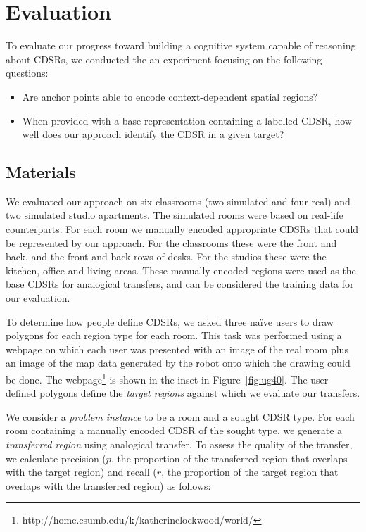 \section{Evaluation}\label{sec:evaluation}

To evaluate our progress toward building a cognitive system capable of reasoning about CDSRs, we conducted the an experiment focusing on the following questions:
\begin{itemize}
\item{Are anchor points able to encode context-dependent spatial regions?}
\item{When provided with a base representation containing a labelled CDSR, how well does our approach identify the CDSR in a given target?}
\end{itemize}

\subsection{Materials}

We evaluated our approach on six classrooms (two simulated and four real) and two simulated studio apartments. The simulated rooms were based on real-life counterparts. For each room we manually encoded appropriate CDSRs that could be represented by our approach. For the classrooms these were the front and back, and the front and back rows of desks. For the studios these were the kitchen, office and living areas. These manually encoded regions were used as the base CDSRs for analogical transfers, and can be considered the training data for our evaluation. 

To determine how people define CDSRs, we asked three na\"ive users to draw polygons for each region type for each room. This task was performed using a webpage on which each user was presented with an image of the real room plus an image of the map data generated by the robot onto which the drawing could be done. The webpage\footnote{http://home.csumb.edu/k/katherinelockwood/world/} is shown in the inset in Figure~\ref{fig:ug40}. The user-defined polygons define the \textit{target regions} against which we evaluate our transfers.

We consider a \textit{problem instance} to be a room and a sought CDSR type. For each room containing a manually encoded CDSR of the sought type, we generate a \textit{transferred region} using analogical transfer. To assess the quality of the transfer, we calculate precision ($p$, the proportion of the transferred region that overlaps with the target region) and recall ($r$, the proportion of the target region that overlaps with the transferred region) as follows:

